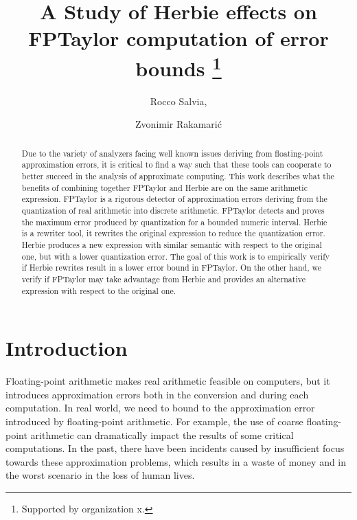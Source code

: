 \documentclass[runningheads]{llncs}
\begin{document}
%
\title{A Study of Herbie effects on FPTaylor computation of error bounds \thanks{Supported by organization x.}}
%
%
\author{Rocco Salvia, \and
Zvonimir Rakamari\'c}
%
%
%
\maketitle              %
%
\begin{abstract}
Due to the variety of analyzers facing well known issues deriving from floating-point approximation errors, it is critical to find a way such that these tools can cooperate to better succeed in the analysis of approximate computing.
This work describes what the benefits of combining together FPTaylor and Herbie are on the same arithmetic expression. 
FPTaylor is a rigorous detector of approximation errors deriving from the quantization of real arithmetic into discrete arithmetic. FPTaylor detects and proves the maximum error produced by quantization for a bounded numeric interval.
Herbie is a rewriter tool, it rewrites the original expression to reduce the quantization error. Herbie produces a new expression with similar semantic with respect to the original one, but with a lower quantization error. The goal of this work is to empirically verify if Herbie rewrites result in a lower error bound in FPTaylor. On the other hand, we verify if FPTaylor may take advantage from Herbie and provides an alternative expression with respect to the original one. 

\end{abstract}
%
%
%
\section{Introduction} Floating-point arithmetic makes real arithmetic feasible on computers, but it introduces approximation errors both in the conversion and during each computation. In real world, we need to bound to the approximation error introduced by floating-point arithmetic. For example, the use of coarse floating-point arithmetic can dramatically impact the results of some critical computations. In the past, there have been incidents caused by insufficient focus towards these approximation problems, which results in a waste of money and in the worst scenario in the loss of human lives.
\end{document}

